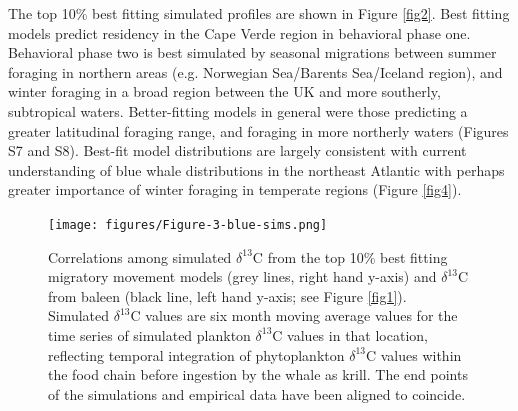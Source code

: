 \documentclass[a4paper,12pt]{article}
\begin{document}
The top 10\% best fitting simulated profiles are shown in Figure \ref{fig2}. 
Best fitting models predict residency in the Cape Verde region in behavioral phase one. Behavioral phase two is best simulated by seasonal migrations between summer foraging in northern areas (e.g. Norwegian Sea/Barents Sea/Iceland region), and winter foraging in a broad region between the UK and more southerly, subtropical waters. Better-fitting models in general were those predicting a greater latitudinal foraging range, and foraging in more northerly waters (Figures S7 and S8). 
Best-fit model distributions are largely consistent with current understanding of blue whale distributions in the northeast Atlantic \citep{reeves2004historical,baines2014upwellings,baines2017autumn,reeves2004historical} with perhaps greater importance of winter foraging in temperate regions (Figure \ref{fig4}).

\begin{figure}
 \centering
  \texttt{[image: figures/Figure-3-blue-sims.png]}
  \caption{Correlations among simulated $\delta^{13}$C from the top 10\% best fitting migratory movement models (grey lines, right hand y-axis) and $\delta^{13}$C from baleen (black line, left hand y-axis; see Figure \ref{fig1}). 
  Simulated $\delta^{13}$C values are six month moving average values for the time series of simulated plankton $\delta^{13}$C values in that location, reflecting temporal integration of phytoplankton $\delta^{13}$C values within the food chain before ingestion by the whale as krill. 
  The end points of the simulations and empirical data have been aligned to coincide.
}
  \label{fig3}
\end{figure}
\end{document}
